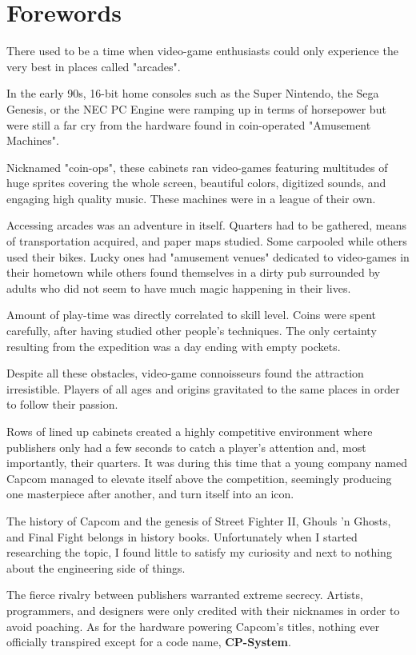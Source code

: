 \chapter*{Forewords}

There used to be a time when video-game enthusiasts could only experience the very best in places called "arcades". 

In the early 90s, 16-bit home consoles such as the Super Nintendo, the Sega Genesis, or the NEC PC Engine were ramping up in terms of horsepower but were still a far cry from the hardware found in coin-operated "Amusement Machines".

Nicknamed "coin-ops", these cabinets ran video-games featuring multitudes of huge sprites covering the whole screen, beautiful colors, digitized sounds, and engaging high quality music. These machines were in a league of their own.

Accessing arcades was an adventure in itself. Quarters had to be gathered, means of transportation acquired, and paper maps studied. Some carpooled while others used their bikes. Lucky ones had "amusement venues" dedicated to video-games in their hometown while others found themselves in a dirty pub surrounded by adults who did not seem to have much magic happening in their lives. 

Amount of play-time was directly correlated to skill level. Coins were spent carefully, after having studied other people's techniques. The only certainty resulting from the expedition was a day ending with empty pockets. 

Despite all these obstacles, video-game connoisseurs found the attraction irresistible. Players of all ages and origins gravitated to the same places in order to follow their passion. 

Rows of lined up cabinets created a highly competitive environment where publishers only had a few seconds to catch a player's attention and, most importantly, their quarters. It was during this time that a young company named Capcom  managed to elevate itself above the competition, seemingly producing one masterpiece after another, and turn itself into an icon.

The history of Capcom and the genesis of Street Fighter II, Ghouls 'n Ghosts, and Final Fight belongs in history books. Unfortunately when I started researching the topic, I found little to satisfy my curiosity and next to nothing about the engineering side of things. 

The fierce rivalry between publishers warranted extreme secrecy. Artists, programmers, and designers were only credited with their nicknames in order to avoid poaching. As for the hardware powering Capcom's titles, nothing ever officially transpired except for a code name, \textbf{CP-System}.

